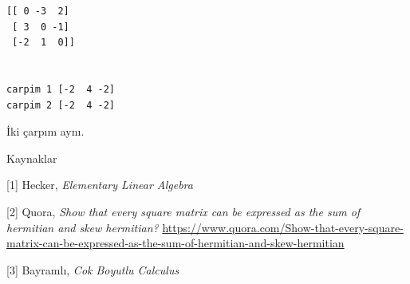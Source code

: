 \documentclass[12pt,fleqn]{article}\usepackage{../../common}
\begin{document}
\begin{verbatim}
[[ 0 -3  2]
 [ 3  0 -1]
 [-2  1  0]]


carpim 1 [-2  4 -2]
carpim 2 [-2  4 -2]
\end{verbatim}

İki çarpım aynı.


Kaynaklar

[1] Hecker, {\em Elementary Linear Algebra}

[2] Quora, {\em Show that every square matrix can be expressed as the sum of hermitian and skew hermitian?}
    \url{https://www.quora.com/Show-that-every-square-matrix-can-be-expressed-as-the-sum-of-hermitian-and-skew-hermitian}

[3] Bayramlı, {\em Cok Boyutlu Calculus}
    
\end{document}
